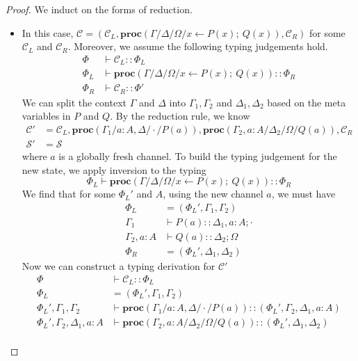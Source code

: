 \documentclass[12pt, openany]{memoir}
\newcommand*{\spawn}[3]{#3 \leftarrow #1(#3);\ #2(#3)}
\newcommand*{\procObj}[4]{\textbf{proc}(#1/#2/#3/#4)}
\newcommand*{\config}[0]{\mathcal{C}}
\newcommand*{\cancelSet}[0]{\mathcal{S}}
\begin{document}
\begin{proof}
  We induct on the forms of reduction.
  \begin{itemize}
    \item [\stepref{spawn}{spawn}] In this case, $\config = (\config_L, \procObj{\Gamma}{\Delta}{\Omega}{\spawn{P}{Q}{x}}, \config_R)$ for some $\config_L$ and $\config_R$. 
    Moreover, we assume the following typing judgements hold.
    \begin{align*}
      \Phi & \vdash \config_L :: \Phi_L \\
      \Phi_L & \vdash \procObj{\Gamma}{\Delta}{\Omega}{\spawn{P}{Q}{x}} :: \Phi_R\\
      \Phi_R & \vdash \config_R :: \Phi'
    \end{align*}
    We can split the context $\Gamma$ and $\Delta$ into $\Gamma_1, \Gamma_2$ and $\Delta_1, \Delta_2$ based on the meta variables in $P$ and $Q$.
    By the reduction rule, we know
    \begin{align*}
      \config' &= \config_L, \procObj{\Gamma_1}{a : A, \Delta}{\cdot}{P(a)}, \procObj{\Gamma_2, a : A}{\Delta_2}{\Omega}{Q(a)}, \config_R \\
      \cancelSet' &= \cancelSet
    \end{align*}
    where $a$ is a globally fresh channel.
    To build the typing judgement for the new state, we apply inversion to the typing 
    \[
      \Phi_L \vdash \procObj{\Gamma}{\Delta}{\Omega}{\spawn{P}{Q}{x}} :: \Phi_R
    \]
    We find that for some $\Phi_L'$ and $A$, using the new channel $a$, we must have
    \begin{align*}
      \Phi_L &= (\Phi_L', \Gamma_1, \Gamma_2) \\
      \Gamma_1 & \vdash P(a) :: \Delta_1, a : A; \cdot \\
      \Gamma_2, a : A & \vdash Q(a) :: \Delta_2; \Omega \\
      \Phi_R &= (\Phi_L', \Delta_1, \Delta_2)
    \end{align*}
    Now we can construct a typing derivation for $\config'$
    \begin{align*}
      \Phi & \vdash \config_L :: \Phi_L \\
      \Phi_L &= (\Phi_L', \Gamma_1, \Gamma_2) \\
      \Phi_L', \Gamma_1, \Gamma_2 & \vdash \procObj{\Gamma_1}{a : A, \Delta}{\cdot}{P(a)} :: (\Phi_L', \Gamma_2, \Delta_1, a : A) \\
      \Phi_L', \Gamma_2, \Delta_1, a : A & \vdash \procObj{\Gamma_2, a : A}{\Delta_2}{\Omega}{Q(a)} :: (\Phi_L', \Delta_1, \Delta_2) \\

\end{align*}
\end{itemize}
\end{proof}
\end{document}

